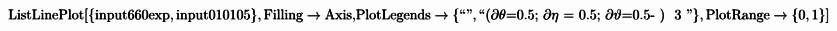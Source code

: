 \documentclass{article}
\newcommand{\unicode}[1]{{}}
\begin{document}
\begin{doublespace}
\noindent\(\pmb{\text{ListLinePlot}[\{\text{input660exp}, \text{input010105}\},\text{Filling}\to \text{Axis}, }\\
\pmb{\text{PlotLegends}\to \{\text{{``}$\unicode{042d}\unicode{043a}\unicode{0441}\unicode{043f}\unicode{0435}\unicode{0440}\unicode{0438}\unicode{043c}\unicode{0435}\unicode{043d}\unicode{0442}${''}},\text{{``}$\unicode{0422}\unicode{0435}\unicode{043e}\unicode{0440}\unicode{0438}\unicode{044f}$($\partial
\theta $=0.5; $\partial \eta $ = 0.5; $\partial \vartheta $=0.5-$\unicode{0432}\unicode{043d}\unicode{0435}\unicode{0448}\unicode{043d}\unicode{0438}\unicode{0439}$
$\unicode{0446}\unicode{0438}\unicode{043a}\unicode{043b}$) $\unicode{0432}\unicode{0440}\unicode{0435}\unicode{043c}\unicode{044f}$ 3 $\unicode{0447}\unicode{0430}\unicode{0441}\unicode{0430}${''}}\},\text{PlotRange}\to
\{0,1\}]}\)
\end{doublespace}

\begin{doublespace}
\noindent\(\begin{array}{cc}
  &  \\
\end{array}\)
\end{doublespace}
\end{document}
